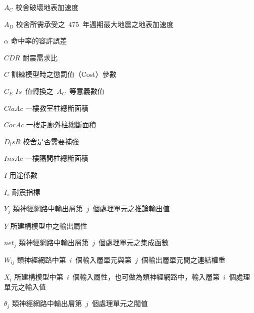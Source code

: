 %
\begin{SymEntry}

\item[$A_C$]
校舍破壞地表加速度

\item[$A_D$]
校舍所需承受之~475~年週期最大地震之地表加速度

\item[$\alpha$]
命中率的容許誤差

\item[$CDR$]
耐震需求比

\item[$C$]
訓練模型時之懲罰值（Cost）參數

\item[$C_E$]
$Is$~值轉換之~$A_C$~等意義數值

\item[$ClaAc$]
一樓教室柱總斷面積

\item[$CorAc$]
一樓走廊外柱總斷面積

\item[$D_isR$]
校舍是否需要補強

\item[$InsAc$]
一樓隔間柱總斷面積

\item[$I$]
用途係數

\item[$I_s$]
耐震指標

\item[$Y_j$]
類神經網路中輸出層第~$j$~個處理單元之推論輸出值

\item[$Y$]
所建構模型中之輸出屬性

\item[$net_j$]
類神經網路中輸出層第~$j$~個處理單元之集成函數

\item[$W_{ij}$]
類神經網路中第~$i$~個輸入層單元與第~$j$~個輸出層單元間之連結權重

\item[$X_i$]
所建構模型中第~$i$~個輸入屬性，也可做為類神經網路中，輸入層第~$i$~個處理單元之輸入值

\item[$\theta_j$]
類神經網路中輸出層第~$j$~個處理單元之閥值


\end{SymEntry}
